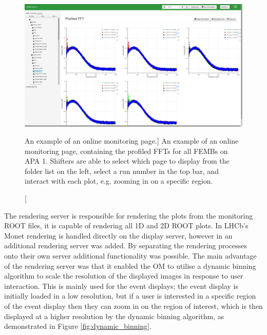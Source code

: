 \begin{figure}

	\centering

	\includegraphics[width=\textwidth]{figures/profiled_fft_monet.png}

	\caption
	[An example of an online monitoring page.] 
	{ An example of an online monitoring page, containing the profiled FFTs for
	all FEMBs on APA 1. Shifters are able to select which page to display from the
	folder list on the left, select a run number in the top bar, and interact 
	with each plot, e.g. zooming in on a specific region.} 
	\label{fig:monet_page}

\end{figure}

The rendering server is responsible for rendering the plots from the monitoring
ROOT files, it is capable of rendering all 1D and 2D ROOT plots. In LHCb's Monet
rendering is handled directly on the display server, however in \protodune{} an
additional rendering server was added. By separating the rendering processes 
onto their own server additional functionality was possible. The main 
advantage of the rendering server was that it enabled the OM to utilise a 
dynamic binning algorithm to scale the resolution of the displayed images in 
response to user interaction. This is mainly used for the event displays; the 
event display is initially loaded in a low resolution, but if a user is 
interested in a specific region of the event display then they can zoom in on 
the region of interest, which is then displayed at a higher resolution by the 
dynamic binning algorithm, as demonstrated in Figure \ref{fig:dynamic_binning}.

